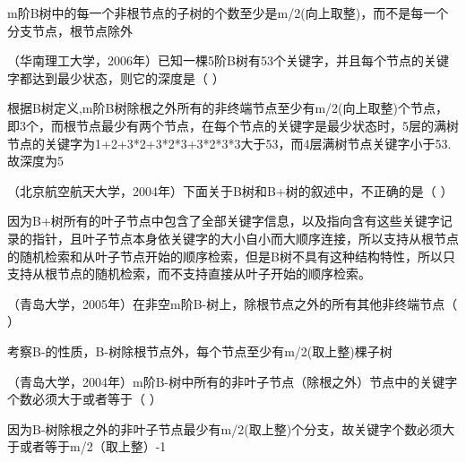 \begin{solution}m阶B树中的每一个非根节点的子树的个数至少是m/2(向上取整)，而不是每一个分支节点，根节点除外
\end{solution}
\question （华南理工大学，2006年）已知一棵5阶B树有53个关键字，并且每个节点的关键字都达到最少状态，则它的深度是（
）
\par{}
\begin{solution}根据B树定义,m阶B树除根之外所有的非终端节点至少有m/2(向上取整)个节点，即3个，而根节点最少有两个节点，在每个节点的关键字是最少状态时，5层的满树节点的关键字为1+2+3*2+3*2*3+3*2*3*3大于53，而4层满树节点关键字小于53.故深度为5
\end{solution}
\question （北京航空航天大学，2004年）下面关于B树和B+树的叙述中，不正确的是（ ）
\par{}
\begin{solution}因为B+树所有的叶子节点中包含了全部关键字信息，以及指向含有这些关键字记录的指针，且叶子节点本身依关键字的大小自小而大顺序连接，所以支持从根节点的随机检索和从叶子节点开始的顺序检索，但是B树不具有这种结构特性，所以只支持从根节点的随机检索，而不支持直接从叶子开始的顺序检索。
\end{solution}
\question （青岛大学，2005年）在非空m阶B-树上，除根节点之外的所有其他非终端节点（
）
\par{}
\begin{solution}考察B-的性质，B-树除根节点外，每个节点至少有m/2(取上整)棵子树
\end{solution}
\question （青岛大学，2004年）m阶B-树中所有的非叶子节点（除根之外）节点中的关键字个数必须大于或者等于（
）
\par{}
\begin{solution}因为B-树除根之外的非叶子节点最少有m/2(取上整)个分支，故关键字个数必须大于或者等于m/2（取上整）-1
\end{solution}
